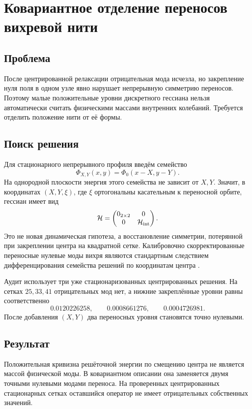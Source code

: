 \chapter{Ковариантное отделение переносов вихревой нити}
\label{ch:v6-bosonic-defect-translation-covariant-discretization-gate}

\section{Проблема}

После центрированной релаксации отрицательная мода исчезла, но закрепление
нуля поля в одном узле явно нарушает непрерывную симметрию переносов. Поэтому
малые положительные уровни дискретного гессиана нельзя автоматически считать
физическими массами внутренних колебаний. Требуется отделить положение нити от
её формы.

\section{Поиск решения}

Для стационарного непрерывного профиля введём семейство
\[
  \Phi_{X,Y}(x,y)=\Phi_0(x-X,y-Y).
\]
На однородной плоскости энергия этого семейства не зависит от $X,Y$. Значит,
в координатах $(X,Y,\xi)$, где $\xi$ ортогональны касательным к переносной
орбите, гессиан имеет вид
\[
  \mathcal H=
  \begin{pmatrix}
    0_{2\times2}&0\\
    0&\mathcal H_{\rm int}
  \end{pmatrix}.
\]
Это не новая динамическая гипотеза, а восстановление симметрии, потерянной при
закреплении центра на квадратной сетке. Калибровочно скорректированные
переносные нулевые моды вихря являются стандартным следствием дифференцирования
семейства решений по координатам центра \cite{gustafson-sigal-vortex-stability,
ting-chen-translation-zero-modes}.

Аудит использует три уже стационаризованных центрированных решения. На сетках
$25,33,41$ отрицательных мод нет, а нижние закреплённые уровни равны
соответственно
\[
  0.0120226258,\qquad 0.0008661276,\qquad 0.0004726981.
\]
После добавления $(X,Y)$ два переносных уровня становятся точно нулевыми.

\section{Результат}

\begin{proposition}
Положительная кривизна решёточной энергии по смещению центра не является
массой физической моды. В ковариантном описании она заменяется двумя точными
нулевыми модами переноса. На проверенных центрированных стационарных сетках
оставшийся оператор не имеет отрицательных собственных значений.
\end{proposition}

